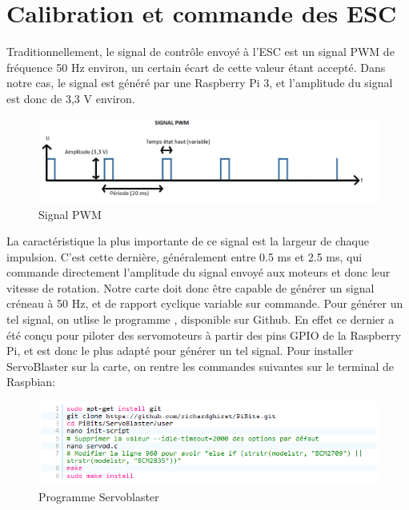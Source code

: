 \documentclass[a4paper,11pt]{report}
\begin{document}
				\newpage\section{Calibration et commande des ESC}
				
				Traditionnellement, le signal de contrôle envoyé à l'ESC est un signal PWM de fréquence 50 Hz environ, un certain écart de cette valeur étant accepté. Dans notre cas, le signal est généré par une Raspberry Pi 3, et l'amplitude du signal est donc de 3,3 V environ.
				\begin{figure}[!h]
				  \begin{center}
				  	\includegraphics[scale=0.6]{Photos/signal_pwm}
						\caption{Signal PWM}
				  \end{center}
		  	\end{figure}
				\newline\newline La caractéristique la plus importante de ce signal est la largeur de chaque impulsion. C'est cette dernière, généralement entre 0.5 ms et 2.5 ms, qui commande directement l'amplitude du signal envoyé aux moteurs et donc leur vitesse de rotation. Notre carte doit donc être capable de générer un signal créneau à 50 Hz, et de rapport cyclique variable sur commande. Pour générer un tel signal, on utlise le programme \cite{ref8}, disponible sur Github. En effet ce dernier a été conçu pour piloter des servomoteurs à partir des pins GPIO de la Raspberry Pi, et est donc le plus adapté pour générer un tel signal. Pour installer ServoBlaster sur la carte, on rentre les commandes suivantes sur le terminal de Raspbian:
				\begin{figure}[!h]
				  \begin{center}
				  	\includegraphics[scale=1]{Photos/ServoBlaster}
						\caption{Programme Servoblaster}
				  \end{center}
		  	\end{figure}
				
\end{document}

